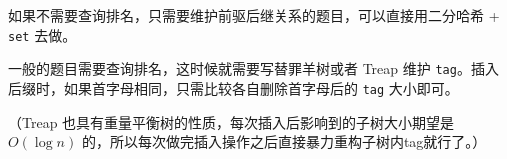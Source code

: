 如果不需要查询排名，只需要维护前驱后继关系的题目，可以直接用二分哈希 + \texttt{set} 去做。

一般的题目需要查询排名，这时候就需要写替罪羊树或者 Treap 维护 \texttt{tag}。插入后缀时，如果首字母相同，只需比较各自删除首字母后的 \texttt{tag} 大小即可。

（Treap 也具有重量平衡树的性质，每次插入后影响到的子树大小期望是 $O(\log n)$ 的，所以每次做完插入操作之后直接暴力重构子树内tag就行了。）
